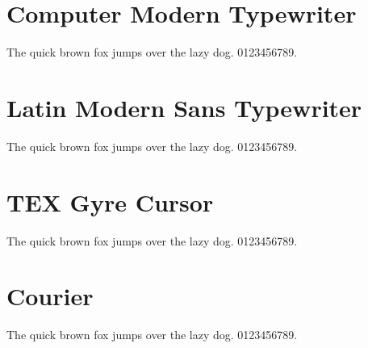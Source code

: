 \documentclass{article}
\begin{document}
\section{Computer Modern Typewriter}
{  \selectfont The quick brown fox jumps over the lazy dog. 0123456789.}

\section{Latin Modern Sans Typewriter}
{  \selectfont The quick brown fox jumps over the lazy dog. 0123456789.}

\section{TEX Gyre Cursor}
{   \selectfont The quick brown fox jumps over the lazy dog. 0123456789.}

\section{Courier}
{   \selectfont The quick brown fox jumps over the lazy dog. 0123456789.}
\end{document}

